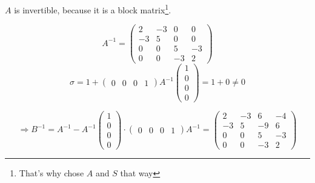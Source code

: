 \documentclass[a4paper]{article}
\theoremstyle{definition}
\begin{document}
$A$ is invertible, because it is a block matrix\footnote{That's why chose $A$ and $S$ that way}.

\[
  A^{-1} = \begin{pmatrix}
    2 & -3 & 0 & 0 \\
    -3 & 5 & 0 & 0 \\
    0 & 0 & 5 & -3 \\
    0 & 0 & -3 & 2
  \end{pmatrix}
\] \[
  \sigma = 1 + \begin{pmatrix} 0 & 0 & 0 & 1 \end{pmatrix} A^{-1} \begin{pmatrix} 1 \\ 0 \\ 0 \\ 0 \end{pmatrix} = 1 + 0 \neq 0
\]

\[ \Rightarrow B^{-1} = A^{-1} - A^{-1} \begin{pmatrix} 1 \\ 0 \\ 0 \\ 0 \end{pmatrix} \cdot \begin{pmatrix} 0 & 0 & 0 & 1 \end{pmatrix} A^{-1}
  = \begin{pmatrix}
    2 & -3 & 6 & -4  \\
    -3 & 5 & -9 & 6 \\
    0 & 0 & 5 & -3 \\
    0 & 0 & -3 & 2
  \end{pmatrix}
\]
\end{document}
